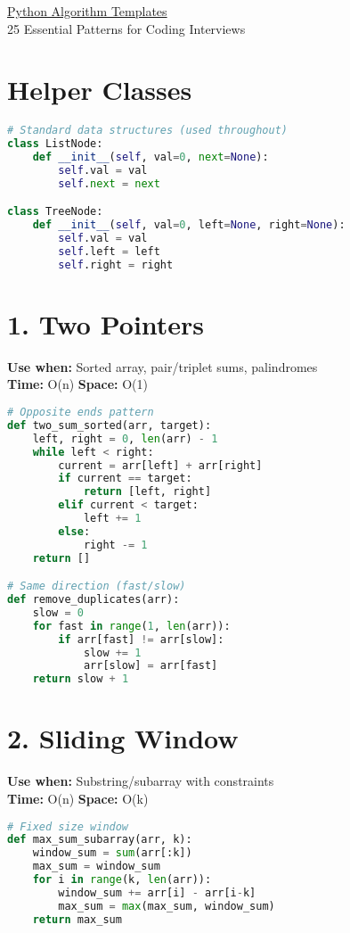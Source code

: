 \documentclass[8pt,landscape]{article}
\begin{document}
\raggedright
\scriptsize
\begin{multicols}{3}

\setlength{\premulticols}{1pt}
\setlength{\postmulticols}{1pt}
\setlength{\multicolsep}{1pt}
\setlength{\columnsep}{2pt}

\begin{center}
     \Large{\underline{Python Algorithm Templates}} \\
     \small{25 Essential Patterns for Coding Interviews}
\end{center}

\section*{Helper Classes}
\begin{lstlisting}[language=Python]
# Standard data structures (used throughout)
class ListNode:
    def __init__(self, val=0, next=None):
        self.val = val
        self.next = next

class TreeNode:
    def __init__(self, val=0, left=None, right=None):
        self.val = val
        self.left = left
        self.right = right
\end{lstlisting}

\section*{1. Two Pointers}
\textbf{Use when:} Sorted array, pair/triplet sums, palindromes \\
\textbf{Time:} O(n) \quad \textbf{Space:} O(1)
\begin{lstlisting}[language=Python]
# Opposite ends pattern
def two_sum_sorted(arr, target):
    left, right = 0, len(arr) - 1
    while left < right:
        current = arr[left] + arr[right]
        if current == target:
            return [left, right]
        elif current < target:
            left += 1
        else:
            right -= 1
    return []

# Same direction (fast/slow)
def remove_duplicates(arr):
    slow = 0
    for fast in range(1, len(arr)):
        if arr[fast] != arr[slow]:
            slow += 1
            arr[slow] = arr[fast]
    return slow + 1
\end{lstlisting}

\section*{2. Sliding Window}
\textbf{Use when:} Substring/subarray with constraints \\
\textbf{Time:} O(n) \quad \textbf{Space:} O(k)
\begin{lstlisting}[language=Python]
# Fixed size window
def max_sum_subarray(arr, k):
    window_sum = sum(arr[:k])
    max_sum = window_sum
    for i in range(k, len(arr)):
        window_sum += arr[i] - arr[i-k]
        max_sum = max(max_sum, window_sum)
    return max_sum


\end{lstlisting}
\end{multicols}
\end{document}
